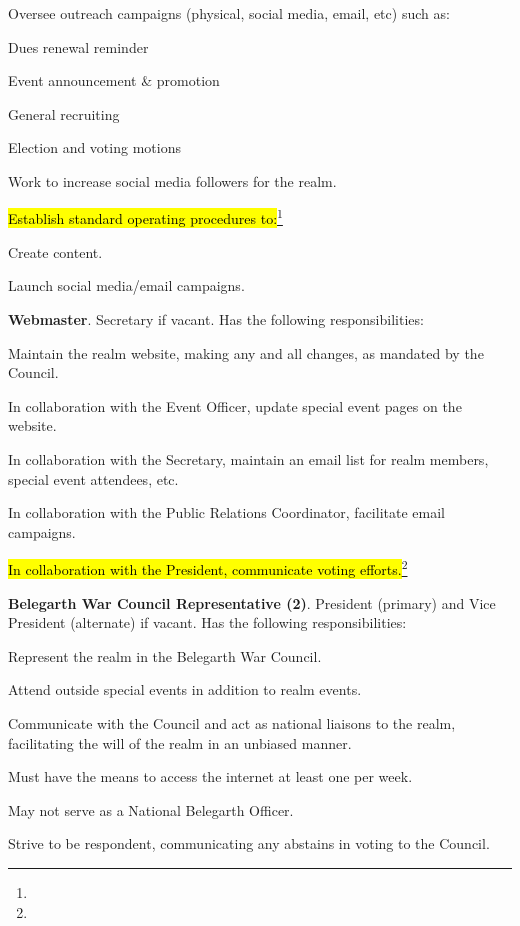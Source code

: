 \documentclass[12pt]{article}
\newcommand{\newpart}[2][]{\hl{#2}\expandafter\ifx\expandafter\relax\detokenize{#1}\relax\else\textnormal{\footnote{#1}}\fi}
\begin{document}
\begin{level}
\begin{level}
\begin{level}
        \item Oversee outreach campaigns (physical, social media, email, etc) such as:
        \begin{level}
            \item Dues renewal reminder
            \item Event announcement \& promotion
            \item General recruiting
            \item Election and voting motions
        \end{level}
        \item Work to increase social media followers for the realm.
        \item \newpart{Establish standard operating procedures to:}
        \begin{level}
            \item Create content.
            \item Launch social media/email campaigns.
        \end{level}
    \end{level}
    \item \textbf{Webmaster}. Secretary if vacant. Has the following responsibilities:
    \begin{level}
        \item Maintain the realm website, making any and all changes, as mandated by the Council.
        \item In collaboration with the Event Officer, update special event pages on the website.
        \item In collaboration with the Secretary, maintain an email list for realm members, special event attendees, etc.
        \item In collaboration with the Public Relations Coordinator, facilitate email campaigns.
        \item \newpart{In collaboration with the President, communicate voting efforts.}
    \end{level}
    \item \textbf{Belegarth War Council Representative (2)}. President (primary) and Vice President (alternate) if vacant. Has the following responsibilities:
    \begin{level}
        \item Represent the realm in the Belegarth War Council.
        \item Attend outside special events in addition to realm events.
        \item Communicate with the Council and act as national liaisons to the realm, facilitating the will of the realm in an unbiased manner.
        \item Must have the means to access the internet at least one per week.
        \item May not serve as a National Belegarth Officer.
        \item Strive to be respondent, communicating any abstains in voting to the Council.
    \end{level}
\end{level}

\end{level}
\end{document}
